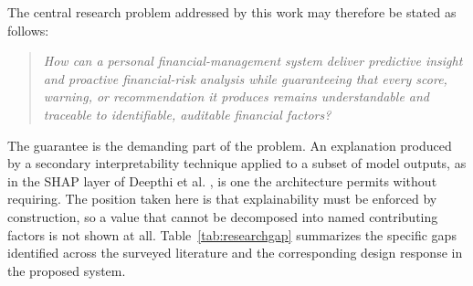 \documentclass[conference]{IEEEtran}
\begin{document}
The central research problem addressed by this work may therefore be stated as follows:

\begin{quote}
\emph{How can a personal financial-management system deliver predictive insight and proactive financial-risk analysis while guaranteeing that every score, warning, or recommendation it produces remains understandable and traceable to identifiable, auditable financial factors?}
\end{quote}

The guarantee is the demanding part of the problem. An explanation produced by a secondary interpretability technique applied to a subset of model outputs, as in the SHAP layer of Deepthi et al. \cite{deepthi2026aipowered}, is one the architecture permits without requiring. The position taken here is that explainability must be enforced by construction, so a value that cannot be decomposed into named contributing factors is not shown at all. Table~\ref{tab:researchgap} summarizes the specific gaps identified across the surveyed literature and the corresponding design response in the proposed system.
\end{document}
